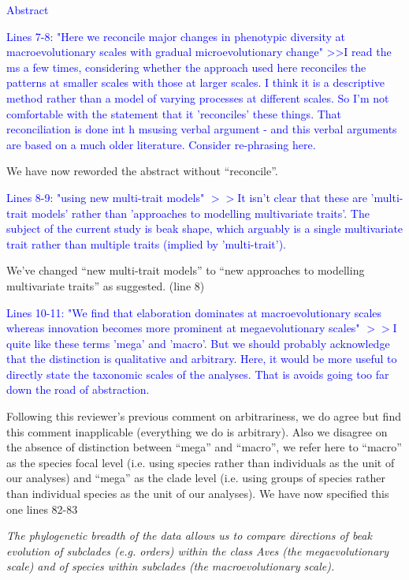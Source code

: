 \documentclass[12pt,letterpaper]{article}
\begin{document}
{\textcolor{blue}{Abstract}

\textcolor{blue}{Lines 7-8: "Here we reconcile major changes in phenotypic diversity at macroevolutionary scales with gradual microevolutionary change"
>>I read the ms a few times, considering whether the approach used here reconciles the patterns at smaller scales with those at larger scales. I think it is a descriptive method rather than a model of varying processes at different scales. So I'm not comfortable with the statement that it 'reconciles' these things. That reconciliation is done int h msusing verbal argument - and this verbal arguments are based on a much older literature. Consider re-phrasing here.}

We have now reworded the abstract without “reconcile”.

\textcolor{blue}{Lines 8-9: "using new multi-trait models"
$>>$It isn't clear that these are 'multi-trait models' rather than 'approaches to modelling multivariate traits'. The subject of the current study is beak shape, which arguably is a single multivariate trait rather than multiple traits (implied by 'multi-trait').}

We’ve changed “new multi-trait models” to “new approaches to modelling multivariate traits” as suggested. (line 8)

\textcolor{blue}{Lines 10-11: "We find that elaboration dominates at macroevolutionary scales whereas innovation becomes more prominent at megaevolutionary scales"
$>>$I quite like these terms 'mega' and 'macro'. But we should probably acknowledge that the distinction is qualitative and arbitrary. Here, it would be more useful to directly state the taxonomic scales of the analyses. That is avoids going too far down the road of abstraction.}

Following this reviewer’s previous comment on arbitrariness, we do agree but find this comment inapplicable (everything we do is arbitrary). Also we disagree on the absence of distinction between “mega” and “macro”, we refer here to “macro” as the species focal level (i.e. using species rather than individuals as the unit of our analyses) and “mega” as the clade level (i.e. using groups of species rather than individual species as the unit of our analyses). We have now specified this one lines 82-83

\noindent\textit{The phylogenetic breadth of the data allows us to compare directions of beak evolution of subclades (e.g. orders) within the class Aves (the megaevolutionary scale) and of species within subclades (the macroevolutionary scale).}%

}
\end{document}
